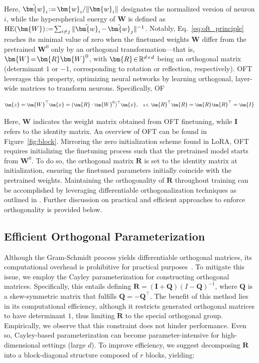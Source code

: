 Here, $\thickmuskip=2mu \medmuskip=2mu \hat{\bm{w}}_i:=\bm{w}_i/\|\bm{w}_i\|$ designates the normalized version of neuron $i$, while the hyperspherical energy of $\bm{W}$ is defined as $\thickmuskip=2mu \medmuskip=2mu \text{HE}(\bm{W}):= \sum_{i\neq j} \|\hat{\bm{w}}_i-\hat{\bm{w}}_j\|^{-1}$. Notably, Eq.~\eqref{eq:oft_principle} reaches its minimal value of zero when the finetuned weights $\bm{W}$ differ from the pretrained $\bm{W}^0$ only by an orthogonal transformation—that is, $\thickmuskip=2mu \medmuskip=2mu \bm{W}=\bm{R}\bm{W}^0$, with $\thickmuskip=2mu \medmuskip=2mu \bm{R}\in\mathbb{R}^{d\times d}$ being an orthogonal matrix (determinant $1$ or $-1$, corresponding to rotation or reflection, respectively). OFT leverages this property, optimizing neural networks by learning orthogonal, layer-wide matrices to transform neurons. Specifically, OF

\begin{equation}\label{eq:oft_general}
    \footnotesize
    \bm{z}=\bm{W}^\top\bm{x}=(\bm{R}\cdot\bm{W}^0)^\top\bm{x},~~~\text{s.t.}~\bm{R}^\top\bm{R}=\bm{R}\bm{R}^\top=\bm{I}
\end{equation}

Here, $\bm{W}$ indicates the weight matrix obtained from OFT finetuning, while $\bm{I}$ refers to the identity matrix. An overview of OFT can be found in Figure~\ref{fig:block}. Mirroring the zero initialization scheme found in LoRA, OFT requires initializing the finetuning process such that the pretrained model starts from $\bm{W}^0$. To do so, the orthogonal matrix $\bm{R}$ is set to the identity matrix at initialization, ensuring the finetuned parameters initially coincide with the pretrained weights. Maintaining the orthogonality of $\bm{R}$ throughout training can be accomplished by leveraging differentiable orthogonalization techniques as outlined in \cite{liu2021orthogonal,lezcano2019cheap}. Further discussion on practical and efficient approaches to enforce orthogonality is provided below.

\subsection{Efficient Orthogonal Parameterization}\label{sect:eff_ortho}

Although the Gram-Schmidt process yields differentiable orthogonal matrices, its computational overhead is prohibitive for practical purposes~\cite{liu2021orthogonal}. To mitigate this issue, we employ the Cayley parameterization for constructing orthogonal matrices. Specifically, this entails defining $\bm{R}=(\bm{I}+\bm{Q})(I-\bm{Q})^{-1}$, where $\bm{Q}$ is a skew-symmetric matrix that fulfills $\bm{Q}=-\bm{Q}^\top$. The benefit of this method lies in its computational efficiency, although it restricts generated orthogonal matrices to have determinant $1$, thus limiting $\bm{R}$ to the special orthogonal group. Empirically, we observe that this constraint does not hinder performance. Even so, Cayley-based parameterization can become parameter-intensive for high-dimensional settings (large $d$). To improve efficiency, we suggest decomposing $\bm{R}$ into a block-diagonal structure composed of $r$ blocks, yielding:

